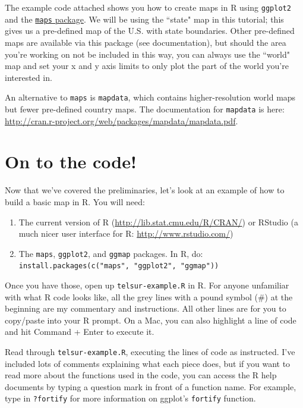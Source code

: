 \documentclass[12pt]{article}
\begin{document}
The example code attached shows you how to create maps in R using \texttt{ggplot2} and the \href{http://cran.r-project.org/web/packages/maps/maps.pdf}{\texttt{maps} package}. We will be using the ``state" map in this tutorial; this gives us a pre-defined map of the U.S. with state boundaries. Other pre-defined maps are available via this package (see documentation), but should the area you're working on not be included in this way, you can always use the ``world" map and set your x and y axis limits to only plot the part of the world you're interested in.

An alternative to \texttt{maps} is \texttt{mapdata}, which contains higher-resolution world maps but fewer pre-defined country maps. The documentation for \texttt{mapdata} is here: \url{http://cran.r-project.org/web/packages/mapdata/mapdata.pdf}.

\section{On to the code!}
Now that we've covered the preliminaries, let's look at an example of how to build a basic map in R. You will need:
\begin{enumerate}
\item The current version of R (\url{http://lib.stat.cmu.edu/R/CRAN/}) or RStudio (a much nicer user interface for R: \url{http://www.rstudio.com/})
\item The \texttt{maps}, \texttt{ggplot2}, and \texttt{ggmap}
  packages. In R, do: \\ \texttt{install.packages(c("maps", "ggplot2", "ggmap"))}
\end{enumerate}

Once you have those, open up \texttt{telsur-example.R} in R. For anyone unfamiliar with what R code looks like, all the grey lines with a pound symbol (\#) at the beginning are my commentary and instructions. All other lines are for you to copy/paste into your R prompt. On a Mac, you can also highlight a line of code and hit Command + Enter to execute it.

Read through \texttt{telsur-example.R}, executing the lines of code as instructed. I've included lots of comments explaining what each piece does, but if you want to read more about the functions used in the code, you can access the R help documents by typing a question mark in front of a function name. For example, type in \texttt{?fortify} for more information on ggplot’s \texttt{fortify} function.
\end{document}
